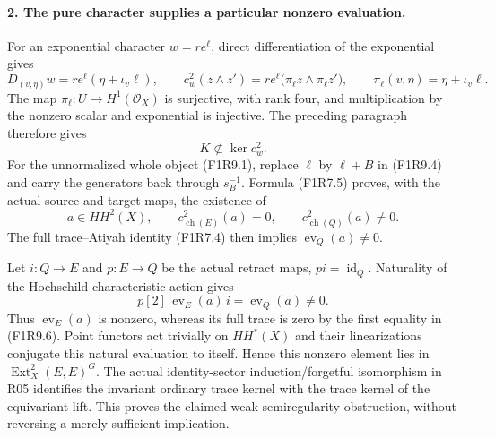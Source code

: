 \paragraph{2. The pure character supplies a particular nonzero evaluation.}
For an exponential character $w=r e^\ell$, direct differentiation
of the exponential gives
\[
 D_{(v,\eta)}w
   =r e^\ell(\eta+\iota_v\ell),\qquad
 c_w^2(z\wedge z')
   =r e^\ell\bigl(\pi_\ell z\wedge\pi_\ell z'\bigr),\qquad
 \pi_\ell(v,\eta)=\eta+\iota_v\ell.
 \tag{F1R9.4}
\]
The map $\pi_\ell:U\to H^1(\mathcal O_X)$ is surjective, with rank
four, and multiplication by the nonzero scalar and exponential is
injective. The preceding paragraph therefore gives
\[
                     K\not\subset\ker c_w^2.
 \tag{F1R9.5}
\]
For the unnormalized whole object (F1R9.1), replace $\ell$ by
$\ell+B$ in (F1R9.4) and carry the generators back through
$s_B^{-1}$. Formula (F1R7.5) proves, with the actual source and
target maps, the existence of
\[
 a\in HH^2(X),\qquad
 c_{\operatorname{ch}(E)}^2(a)=0,\qquad
 c_{\operatorname{ch}(Q)}^2(a)\ne0.
 \tag{F1R9.6}
\]
The full trace--Atiyah identity (F1R7.4) then implies
$\operatorname{ev}_Q(a)\ne0$.

Let $i:Q\to E$ and $p:E\to Q$ be the actual retract maps,
$pi=\operatorname{id}_Q$. Naturality of the Hochschild
characteristic action gives
\[
 p[2]\,\operatorname{ev}_E(a)\,i=\operatorname{ev}_Q(a)\ne0.
 \tag{F1R9.7}
\]
Thus $\operatorname{ev}_E(a)$ is nonzero, whereas its full trace is
zero by the first equality in (F1R9.6). Point functors act trivially
on $HH^*(X)$ and their linearizations conjugate this natural
evaluation to itself. Hence this nonzero element lies in
$\operatorname{Ext}^2_X(E,E)^G$. The actual identity-sector
induction/forgetful isomorphism in R05 identifies the invariant
ordinary trace kernel with the trace kernel of the equivariant
lift. This proves the claimed weak-semiregularity obstruction,
without reversing a merely sufficient implication.

